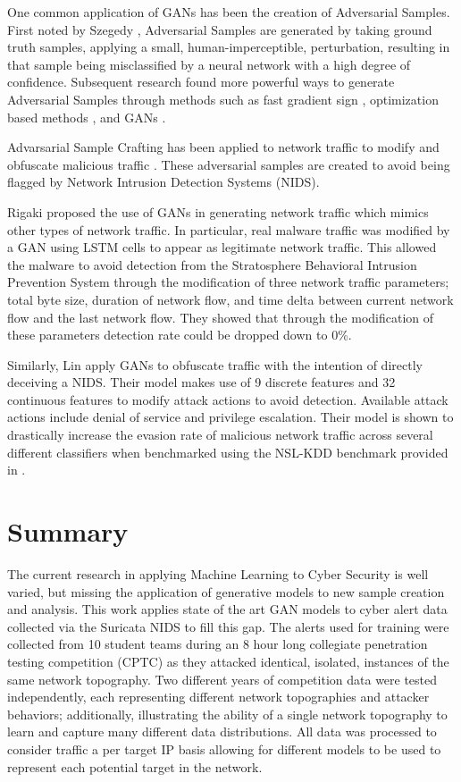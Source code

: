 One common application of GANs has been the creation of Adversarial Samples. First noted by Szegedy \etal \cite{Szegedy2013}, Adversarial Samples are generated by taking ground truth samples, applying a small, human-imperceptible, perturbation, resulting in that sample being misclassified by a neural network with a high degree of confidence. Subsequent research found more powerful ways to generate Adversarial Samples through methods such as fast gradient sign \cite{Goodfellow2015}, optimization based methods \cite{Carlini2017, Liu2017, Eykholt2018}, and GANs \cite{Xiao2018, Rigaki2018, Lin2018, Hu2017, Anderson2017}. 

Advarsarial Sample Crafting has been applied to network traffic to modify and obfuscate malicious traffic \cite{Rigaki2018, Lin2018, Hu2017, Anderson2017}. These adversarial samples are created to avoid being flagged by Network Intrusion Detection Systems (NIDS).

Rigaki \etal \cite{Rigaki2018} proposed the use of GANs in generating network traffic which mimics other types of network traffic. In particular, real malware traffic was modified by a GAN using LSTM cells to appear as legitimate network traffic. This allowed the malware to avoid detection from the Stratosphere Behavioral Intrusion Prevention System through the modification of three network traffic parameters; total byte size, duration of network flow, and time delta between current network flow and the last network flow. They showed that through the modification of these parameters detection rate could be dropped down to 0\%. 

Similarly, Lin \etal \cite{Lin2018} apply GANs to obfuscate traffic with the intention of directly deceiving a NIDS. Their model makes use of 9 discrete features and 32 continuous features to modify attack actions to avoid detection. Available attack actions include denial of service and privilege escalation. Their model is shown to drastically increase the evasion rate of malicious network traffic across several different classifiers when benchmarked using the NSL-KDD benchmark provided in \cite{Hu2015}.

\section{Summary}

The current research in applying Machine Learning to Cyber Security is well varied, but missing the application of generative models to new sample creation and analysis. This work applies state of the art GAN models to cyber alert data collected via the Suricata NIDS to fill this gap. The alerts used for training were collected from 10 student teams during an 8 hour long collegiate penetration testing competition (CPTC) as they attacked identical, isolated, instances of the same network topography. Two different years of competition data were tested independently, each representing different network topographies and attacker behaviors; additionally, illustrating the ability of a single network topography to learn and capture many different data distributions. All data was processed to consider traffic a per target IP basis allowing for different models to be used to represent each potential target in the network. 

